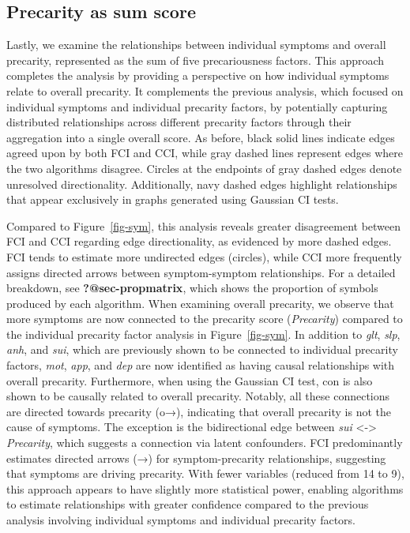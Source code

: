 \documentclass[
]{article}
\begin{document}
\subsection{Precarity as sum score}\label{precarity-as-sum-score}

Lastly, we examine the relationships between individual symptoms and
overall precarity, represented as the sum of five precariousness
factors. This approach completes the analysis by providing a perspective
on how individual symptoms relate to overall precarity. It complements
the previous analysis, which focused on individual symptoms and
individual precarity factors, by potentially capturing distributed
relationships across different precarity factors through their
aggregation into a single overall score. As before, black solid lines
indicate edges agreed upon by both FCI and CCI, while gray dashed lines
represent edges where the two algorithms disagree. Circles at the
endpoints of gray dashed edges denote unresolved directionality.
Additionally, navy dashed edges highlight relationships that appear
exclusively in graphs generated using Gaussian CI tests.

Compared to Figure~\ref{fig-sym}, this analysis reveals greater
disagreement between FCI and CCI regarding edge directionality, as
evidenced by more dashed edges. FCI tends to estimate more undirected
edges (circles), while CCI more frequently assigns directed arrows
between symptom-symptom relationships. For a detailed breakdown, see
\textbf{?@sec-propmatrix}, which shows the proportion of symbols
produced by each algorithm. When examining overall precarity, we observe
that more symptoms are now connected to the precarity score
(\emph{Precarity}) compared to the individual precarity factor analysis
in Figure~\ref{fig-sym}. In addition to \emph{glt}, \emph{slp},
\emph{anh}, and \emph{sui}, which are previously shown to be connected
to individual precarity factors, \emph{mot}, \emph{app}, and \emph{dep}
are now identified as having causal relationships with overall
precarity. Furthermore, when using the Gaussian CI test, con is also
shown to be causally related to overall precarity. Notably, all these
connections are directed towards precarity (o→), indicating that overall
precarity is not the cause of symptoms. The exception is the
bidirectional edge between \emph{sui} \textless-\textgreater{}
\emph{Precarity}, which suggests a connection via latent confounders.
FCI predominantly estimates directed arrows (→) for symptom-precarity
relationships, suggesting that symptoms are driving precarity. With
fewer variables (reduced from 14 to 9), this approach appears to have
slightly more statistical power, enabling algorithms to estimate
relationships with greater confidence compared to the previous analysis
involving individual symptoms and individual precarity factors.
\end{document}

